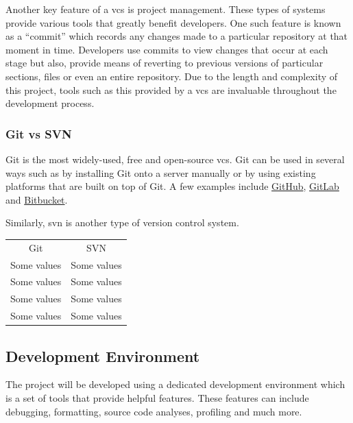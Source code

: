 \documentclass[11pt]{article}
\begin{document}
Another key feature of a \gls*{vcs} is project management. These types of systems
provide various tools that greatly benefit developers. One such feature is known
as a ``commit'' which records any changes made to a particular repository at
that moment in time. Developers use commits to view changes that occur at each
stage but also, provide means of reverting to previous versions of particular
sections, files or even an entire repository. Due to the length and complexity
of this project, tools such as this provided by a \gls*{vcs} are invaluable
throughout the development process.

\subsubsection{Git vs SVN}

Git is the most widely-used, free and open-source \gls*{vcs}. Git can be used in
several ways such as by installing Git onto a server manually or by using
existing platforms that are built on top of Git. A few examples include
\href{http://github.com}{GitHub}, \href{http://gitlab.com}{GitLab} and
\href{https://bitbucket.org/}{Bitbucket}. 

Similarly, \gls*{svn} is another type of version control system. 

\begin{center}
  \begin{tabular}{cc}
    
    \rowcolor{gray!50}
    Git & SVN\\
    Some values & Some values\\
    Some values & Some values\\
    Some values & Some values\\
    Some values & Some values\\
  \end{tabular}  
\end{center}

\subsection{Development Environment}

The project will be developed using a dedicated development environment which is
a set of tools that provide helpful features. These features can include
debugging, formatting, source code analyses, profiling and much more.
\end{document}

